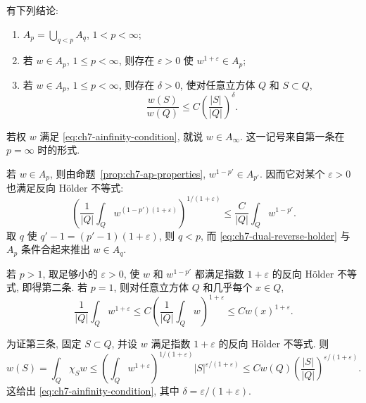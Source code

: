 \begin{Corollary}
\label{cor:ch7-ap-self-improvement}
有下列结论:
\begin{enumerate}[label=(\arabic*)]
\item $A_p=\bigcup_{q<p}A_q$, $1<p<\infty$;
\item 若 $w\in A_p$, $1\le p<\infty$, 则存在 $\varepsilon>0$ 使 $w^{1+\varepsilon}\in A_p$;
\item 若 $w\in A_p$, $1\le p<\infty$, 则存在 $\delta>0$, 使对任意立方体 $Q$ 和 $S\subset Q$,
\begin{equation}
\label{eq:ch7-ainfinity-condition}
 \frac{w(S)}{w(Q)}\le C\left(\frac{|S|}{|Q|}\right)^\delta.
\end{equation}
\end{enumerate}
\end{Corollary}

若权 $w$ 满足 \eqref{eq:ch7-ainfinity-condition}, 就说 $w\in A_\infty$. 这一记号来自第一条在 $p=\infty$ 时的形式.

\begin{Proof}
若 $w\in A_p$, 则由命题~\ref{prop:ch7-ap-properties}, $w^{1-p'}\in A_{p'}$. 因而它对某个 $\varepsilon>0$ 也满足反向 Hölder 不等式:
\begin{equation}
\label{eq:ch7-dual-reverse-holder}
 \left(\frac1{|Q|}\int_Qw^{(1-p')(1+\varepsilon)}\right)^{1/(1+\varepsilon)}
 \le\frac C{|Q|}\int_Qw^{1-p'}.
\end{equation}
取 $q$ 使 $q'-1=(p'-1)(1+\varepsilon)$, 则 $q<p$, 而 \eqref{eq:ch7-dual-reverse-holder} 与 $A_p$ 条件合起来推出 $w\in A_q$.

\hypertarget{chapter-07-page-152}{}
若 $p>1$, 取足够小的 $\varepsilon>0$, 使 $w$ 和 $w^{1-p'}$ 都满足指数 $1+\varepsilon$ 的反向 Hölder 不等式, 即得第二条. 若 $p=1$, 则对任意立方体 $Q$ 和几乎每个 $x\in Q$,
\[
 \frac1{|Q|}\int_Qw^{1+\varepsilon}
 \le C\left(\frac1{|Q|}\int_Qw\right)^{1+\varepsilon}
 \le Cw(x)^{1+\varepsilon}.
\]

为证第三条, 固定 $S\subset Q$, 并设 $w$ 满足指数 $1+\varepsilon$ 的反向 Hölder 不等式. 则
\[
 w(S)=\int_Q\chi_Sw
 \le\left(\int_Qw^{1+\varepsilon}\right)^{1/(1+\varepsilon)}
 |S|^{\varepsilon/(1+\varepsilon)}
 \le Cw(Q)\left(\frac{|S|}{|Q|}\right)^{\varepsilon/(1+\varepsilon)}.
\]
这给出 \eqref{eq:ch7-ainfinity-condition}, 其中 $\delta=\varepsilon/(1+\varepsilon)$.
\end{Proof}
